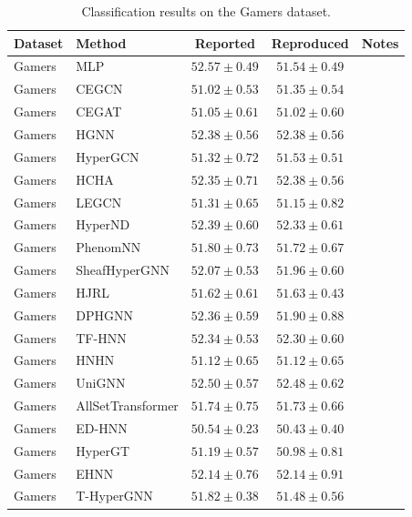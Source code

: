\vspace{3em}

\begin{table}[H]
    \centering \small
    \renewcommand{\arraystretch}{1.12} 
    \begin{tabular}{llccc}
        \toprule
        Dataset & Method & Reported & Reproduced & Notes \\
        \midrule
        Gamers & MLP & \(52.57 \pm 0.49\) & \(51.54 \pm 0.49\) & \\
        Gamers & CEGCN & \(51.02 \pm 0.53\) & \(51.35 \pm 0.54\) & \\
        Gamers & CEGAT & \(51.05 \pm 0.61\) & \(51.02 \pm 0.60\) & \\
        \grprule
        Gamers & HGNN & \(52.38 \pm 0.56\) & \(52.38 \pm 0.56\) & \\
        Gamers & HyperGCN & \(51.32 \pm 0.72\) & \(51.53 \pm 0.51\) & \\
        Gamers & HCHA & \(52.35 \pm 0.71\) & \(52.38 \pm 0.56\) & \\
        Gamers & LEGCN & \(51.31 \pm 0.65\) & \(51.15 \pm 0.82\) & \\
        Gamers & HyperND & \(52.39 \pm 0.60\) & \(52.33 \pm 0.61\) & \\
        Gamers & PhenomNN & \(51.80 \pm 0.73\) & \(51.72 \pm 0.67\) & \\
        Gamers & SheafHyperGNN & \(52.07 \pm 0.53\) & \(51.96 \pm 0.60\) & \\
        Gamers & HJRL & \(51.62 \pm 0.61\) & \(51.63 \pm 0.43\) & \\
        Gamers & DPHGNN & \(52.36 \pm 0.59\) & \(51.90 \pm 0.88\) & \\
        Gamers & TF-HNN & \(52.34 \pm 0.53\) & \(52.30 \pm 0.60\) & \\
        \grprule
        Gamers & HNHN & \(51.12 \pm 0.65\) & \(51.12 \pm 0.65\) & \\
        Gamers & UniGNN & \(52.50 \pm 0.57\) & \(52.48 \pm 0.62\) & \\
        Gamers & AllSetTransformer & \(51.74 \pm 0.75\) & \(51.73 \pm 0.66\) & \\
        Gamers & ED-HNN & \(50.54 \pm 0.23\) & \(50.43 \pm 0.40\) & \\
        Gamers & HyperGT & \(51.19 \pm 0.57\) & \(50.98 \pm 0.81\) & \\
        \grprule
        Gamers & EHNN & \(52.14 \pm 0.76\) & \(52.14 \pm 0.91\) & \\
        Gamers & T-HyperGNN & \(51.82 \pm 0.38\) & \(51.48 \pm 0.56\) & \\
        \bottomrule
    \end{tabular}
    \caption{Classification results on the Gamers dataset.}
\end{table}

